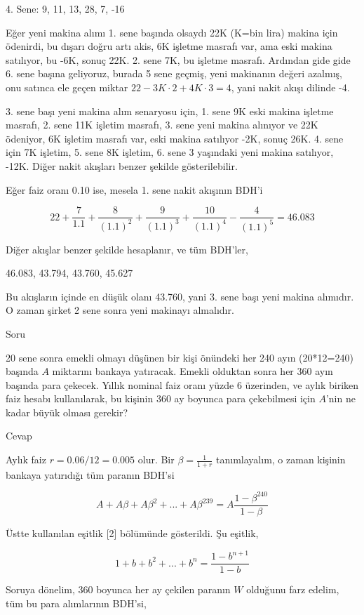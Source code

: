 \documentclass[12pt,fleqn]{article}\usepackage{../../common}
\begin{document}
4. Sene: 9, 11, 13, 28, 7, -16

Eğer yeni makina alımı 1. sene başında olsaydı 22K (K=bin lira) makina için
ödenirdi, bu dışarı doğru artı akis, 6K işletme masrafı var, ama eski makina
satılıyor, bu -6K, sonuç 22K. 2. sene 7K, bu işletme masrafı. Ardından gide gide
6. sene başına geliyoruz, burada 5 sene geçmiş, yeni makinanın değeri azalmış,
onu satınca ele geçen miktar $22 - 3K \cdot 2 + 4K \cdot 3 = 4$, yani nakit
akışı dilinde -4.

3. sene başı yeni makina alım senaryosu için, 1. sene 9K eski makina işletme
masrafı, 2. sene 11K işletim masrafı, 3. sene yeni makina alınıyor ve 22K
ödeniyor, 6K işletim masrafı var, eski makina satılıyor -2K, sonuç 26K. 4. sene
için 7K işletim, 5. sene 8K işletim, 6. sene 3 yaşındaki yeni makina satılıyor,
-12K. Diğer nakit akışları benzer şekilde gösterilebilir.

Eğer faiz oranı 0.10 ise, mesela 1. sene nakit akışının BDH'i 

$$
22 + \frac{7}{1.1} + \frac{8}{(1.1)^2} + \frac{9}{(1.1)^3} +
\frac{10}{(1.1)^4} - \frac{4}{(1.1)^5}  = 46.083
$$

Diğer akışlar benzer şekilde hesaplanır, ve tüm BDH'ler,

46.083, 43.794, 43.760, 45.627

Bu akışların içinde en düşük olanı 43.760, yani 3. sene başı yeni makina
alımıdır. O zaman şirket 2 sene sonra yeni makinayı almalıdır. 

Soru

20 sene sonra emekli olmayı düşünen bir kişi önündeki her 240 ayın (20*12=240)
başında $A$ miktarını bankaya yatıracak. Emekli olduktan sonra her 360 ayın
başında para çekecek. Yıllık nominal faiz oranı yüzde 6 üzerinden, ve aylık
biriken faiz hesabı kullanılarak, bu kişinin 360 ay boyunca para çekebilmesi
için $A$'nin ne kadar büyük olması gerekir? 

Cevap

Aylık faiz $r = 0.06 / 12 = 0.005$ olur. Bir $\beta = \frac{1}{1+r}$
tanımlayalım, o zaman kişinin bankaya yatırıdığı tüm paranın BDH'si

$$
A + A\beta + A\beta^2 + ... + A\beta^{239} =
A \frac{1-\beta^{240}}{1-\beta}
$$

Üstte kullanılan eşitlik [2] bölümünde gösterildi. Şu eşitlik,

$$ 1 + b + b^2 + ... + b^n = \frac{1-b^{n+1}}{1-b} $$

Soruya dönelim, 360 boyunca her ay çekilen paranın $W$ olduğunu farz edelim, tüm
bu para alımlarının BDH'si,
\end{document}
